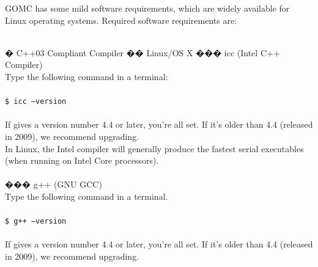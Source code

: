 GOMC has some mild software requirements, which are widely available for Linux operating systems.  Required software requirements are:\\\\
\begin{easylist}[articletoc]
� C++03 Compliant Compiler
�� Linux/OS X
��� icc (Intel C++ Compiler)\\
Type the following command in a terminal: \\\\
\texttt{\$ icc --version} \\\\
If gives a version number 4.4 or later, you're all set.  If it's older than 4.4 (released in 2009), we recommend upgrading. \\
In Linux, the Intel compiler will generally produce the fastest serial executables (when running on Intel Core processors). \\\\
��� g++ (GNU GCC) \\
Type the following command in a terminal.\\\\
\texttt{\$ g++ --version}\\\\
If gives a version number 4.4 or later, you're all set. If it's older than 4.4 (released in 2009), we recommend upgrading.


\end{easylist}
